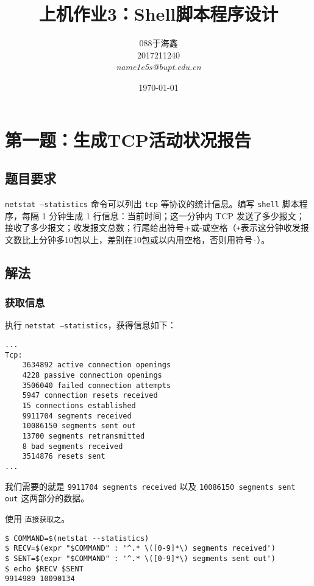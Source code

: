 \documentclass[blue,normal,cn]{elegantnote}
\title{上机作业3：Shell脚本程序设计}
\date{\today}
\newcommand{\code}[1]{\colorbox{light-gray}{\texttt{#1}}}
\begin{document}
\author{
	\begin{tabular}[t]{c}
		088于海鑫  \\
		2017211240 \\
		\emph{name1e5s@bupt.edu.cn}
	\end{tabular}
}
\maketitle

\section{第一题：生成TCP活动状况报告}

\subsection{题目要求}

\code{netstat --statistics} 命令可以列出 \code{tcp} 等协议的统计信息。编写 \code{shell} 脚本程序，每隔 1 分钟生成 1 行信息：当前时间；这一分钟内 TCP 发送了多少报文；接收了多少报文；收发报文总数；行尾给出符号+或-或空格（\code{+}表示这分钟收发报文数比上分钟多10包以上，差别在10包或以内用空格，否则用符号\code{-}）。

\subsection{解法}

\subsubsection{获取信息}

执行 \code{netstat --statistics}，获得信息如下：

\begin{lstlisting}
... 
Tcp:
    3634892 active connection openings
    4228 passive connection openings
    3506040 failed connection attempts
    5947 connection resets received
    15 connections established
    9911704 segments received
    10086150 segments sent out
    13700 segments retransmitted
    8 bad segments received
    3514876 resets sent
...
\end{lstlisting}

我们需要的就是 \code{9911704 segments received} 以及
\code{10086150 segments sent out} 这两部分的数据。

使用 \code{直接获取之}。

\begin{lstlisting}
$ COMMAND=$(netstat --statistics)
$ RECV=$(expr "$COMMAND" : '^.* \([0-9]*\) segments received')
$ SENT=$(expr "$COMMAND" : '^.* \([0-9]*\) segments sent out')
$ echo $RECV $SENT
9914989 10090134
\end{lstlisting}
\end{document}
